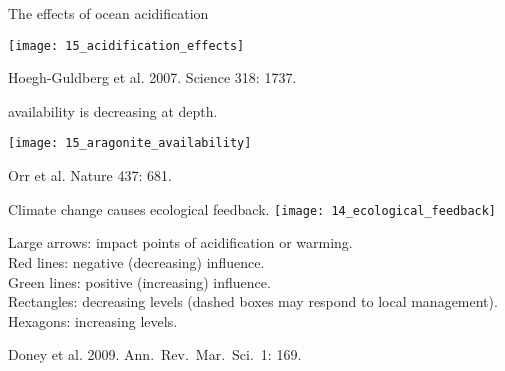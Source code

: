 \documentclass[t,handout]{beamer}  %
\begin{document}

\begin{frame}[t]{The effects of ocean acidification}

	\texttt{[image: 15\_acidification\_effects]}

	\vfilll
	
	\tiny \hfill Hoegh-Guldberg et al. 2007. Science 318: 1737.  

	
\end{frame}
%
{
\begin{frame}[b]

\hfill \tiny {}
\end{frame}
}
%
\begin{frame}{ availability is decreasing at depth.}

\vspace{-0.5\baselineskip}

\texttt{[image: 15\_aragonite\_availability]}

\vfilll

\tiny \hfill Orr et al. Nature 437: 681.  

\end{frame}


%
\begin{frame}{Climate change causes ecological feedback.}
\texttt{[image: 14\_ecological\_feedback]}

\bigskip

{\small
Large arrows: impact points of acidification or warming. \\
Red lines: negative (decreasing) influence. \\
Green lines: positive (increasing) influence. \\
Rectangles: decreasing levels (dashed boxes may respond to local management). \\
Hexagons: increasing levels.}

\end{frame}
%

{
\begin{frame}[b]

\hfill \tiny Doney et al. 2009. Ann.~Rev.~Mar.~Sci.~1: 169.  

\end{frame}
}
\end{document}
